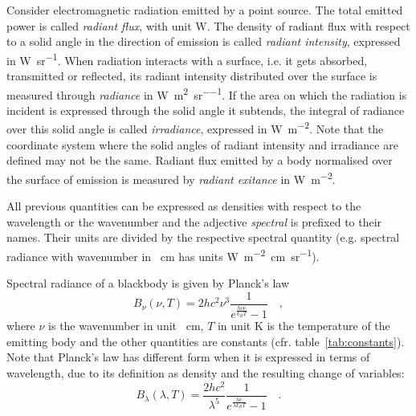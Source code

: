 \documentclass[a4paper,10pt,twocolumn,\classoptions]{article}
\begin{document}
Consider electromagnetic radiation emitted by a point source. The total emitted power is called \emph{radiant flux}, with unit \unit{\watt}. The density of radiant flux with respect to a solid angle in the direction of emission is called \emph{radiant intensity}, expressed in \unit{\watt\per\steradian}. When radiation interacts with a surface, i.e. it gets absorbed, transmitted or reflected, its radiant intensity distributed over the surface is measured through \emph{radiance} in \unit{\watt\per\square\metre\per\steradian}. If the area on which the radiation is incident is expressed through the solid angle it subtends, the integral of radiance over this solid angle is called \emph{irradiance}, expressed in \unit{\watt\per\square\metre}. Note that the coordinate system where the solid angles of radiant intensity and irradiance are defined may not be the same. Radiant flux emitted by a body normalised over the surface of emission is measured by \emph{radiant exitance} in \unit{\watt\per\square\metre}.


All previous quantities can be expressed as densities with respect to the wavelength or the wavenumber and the adjective \emph{spectral} is prefixed to their names. Their units are divided by the respective spectral quantity (e.g. spectral radiance with wavenumber in \unit{\per\centi\metre} has units \unit{\watt\per\metre\squared\centi\metre\per\steradian}).

Spectral radiance of a blackbody is given by Planck's law
\begin{equation}
  \label{eq:spectral_radiance_blackbody}
  B_\nu (\nu, T) = 2 h c^2 \nu^3 \frac{1}{e^\frac{h c \nu}{k_B T} - 1}
  \quad ,
\end{equation}
where $\nu$ is the wavenumber in unit \unit{\per\centi\metre}, $T$ in unit \unit{\kelvin} is the temperature of the emitting body and the other quantities are constants (cfr. table~\ref{tab:constants}).
Note that Planck's law has different form when it is expressed in terms of wavelength, due to its definition as density and the resulting change of variables:
\begin{equation}
  \label{eq:spectral_radiance_blackbody_lambda}
  B_\lambda (\lambda, T) = \frac{2 h c^2}{\lambda^5} \frac{1}{e^\frac{h c}{\lambda k_B T} - 1}
  \quad .
\end{equation}
\end{document}
